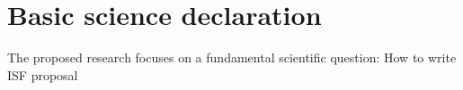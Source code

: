 \documentclass[11pt]{article}
\begin{document}

\section*{Basic science declaration}
%
%
% 

The proposed research focuses on a fundamental scientific question: How to write ISF proposal 
\end{document}
